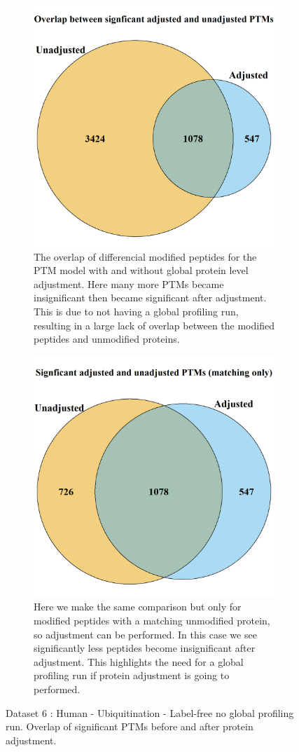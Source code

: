 \documentclass[mcp]{article}
\numberwithin{figure}{section} %
\numberwithin{table}{section}
\begin{document}
\begin{figure}[h!]
\centering
 \begin{subfigure}{\textwidth}
 \centering
	\includegraphics[height=.5\textwidth]{images/usp30_venn_diagramm}
	\caption{The overlap of differencial modified peptides for the PTM model with and without global protein level adjustment. Here many more PTMs became insignificant then became significant after adjustment. This is due to not having a global profiling run, resulting in a large lack of overlap between the modified peptides and unmodified proteins.}
 \end{subfigure}\vspace{5mm}
 \begin{subfigure}{\textwidth}
 \centering
	\includegraphics[height=.5\textwidth]{images/usp30_venn_diagramm_matching_only}
	\caption{Here we make the same comparison but only for modified peptides with a matching unmodified protein, so adjustment can be performed. In this case we see significantly less peptides become insignificant after adjustment. This highlights the need for a global profiling run if protein adjustment is going to performed.}
 \end{subfigure}
 \caption{Dataset 6 : Human - Ubiquitination - Label-free no global profiling run. Overlap of significant PTMs before and after protein adjustment.}
\label{fig:usp30_ven_d}
\end{figure}
\end{document}
